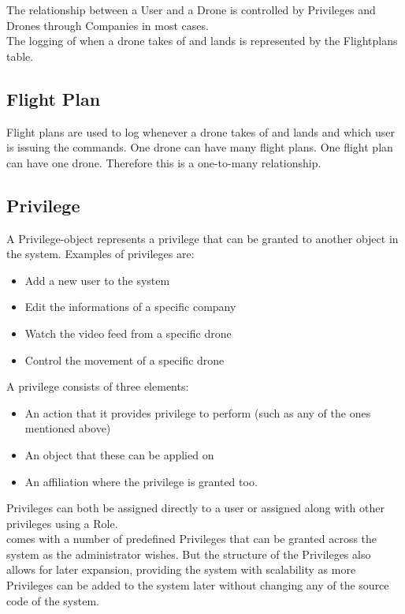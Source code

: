 The relationship between a User and a Drone is controlled by Privileges and Drones through Companies in most cases. \\

The logging of when a drone takes of and lands is represented by the Flightplans table.


\subsection{Flight Plan}
Flight plans are used to log whenever a drone takes of and lands and which user is issuing the commands.
One drone can have many flight plans.
One flight plan can have one drone.
Therefore this is a one-to-many relationship.


\subsection{Privilege}
\label{sec:privileges}
A Privilege-object represents a privilege that can be granted to another object in the system.
Examples of privileges are:

\begin{itemize}
    \item Add a new user to the system
    \item Edit the informations of a specific company
    \item Watch the video feed from a specific drone
    \item Control the movement of a specific drone
\end{itemize}

A privilege consists of three elements:

\begin{itemize}
    \item An action that it provides privilege to perform (such as any of the ones mentioned above)
    \item An object that these can be applied on
    \item An affiliation where the privilege is granted too.
\end{itemize}

Privileges can both be assigned directly to a user or assigned along with other privileges using a Role. \\

\projectname{} comes with a number of predefined Privileges that can be granted across the system as the administrator wishes.
But the structure of the Privileges also allows for later expansion, providing the system with scalability as more Privileges can be added to the system later without changing any of the source code of the system.


